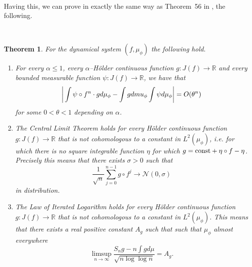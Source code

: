 \documentclass[12pt]{amsart}
\numberwithin{equation}{section}
\newcommand{\nl}{\newline}
\newtheorem{thm}{Theorem}[section]
\def\sp{\medskip}             \def\fr{\noindent}        \def\nl{\newline}
\begin{document}
\

\fr Having this, we can prove in exactly the same way as Theorem~56
in \cite{SUZ1}, the following. 

\

\begin{thm}\label{t220110627}
For the dynamical system $(f,\mu_\phi)$ the following hold.
\begin{enumerate}
\item{} For every $\alpha\le 1$, every $\alpha$--H\"older continuous
  function $g:J(f)\to \mathbb{R}$ and every bounded measurable
  function $\psi:J(f)\to\mathbb{R}$, we have that
$$
\bigg|\int\psi\circ f^n \cdot g d\mu_\phi
-\int g d\\mu_\phi\int\psi d\mu_\phi\bigg|
=O(\theta^n)
$$
for some $0<\theta<1$ depending on $\alpha$.

\sp\item{} The Central Limit Theorem holds for every H\"older continuous
  function $g:J(f)\to  \mathbb{R}$ that is not
  cohomologous to a constant in $L^2(\mu_\phi)$, i.e. for which there is no
  square integrable function $\eta$ for which $g={\rm
    const}+\eta\circ f-\eta$. Precisely this means that
 there exists $\sigma>0$ such that
$$
\frac{1}{\sqrt{n}}{\sum_{j=0}^{n-1}g\circ f^j} \to \mathcal N(0,\sigma)
$$ 
in distribution.
\sp\item{} The Law of Iterated Logarithm holds for every H\"older continuous
function $g:J(f)\to \mathbb{R}$ that is not cohomologous to a constant
in $L^2(\mu_\phi)$. This means that there exists a real positive
constant $A_g$ such that such that $\mu_\phi$ almost everywhere 
$$
\limsup_{n\to\infty}\frac{S_{n}g-n\int gd\mu}{\sqrt{n\log\log n}}=A_g. 
$$
\end{enumerate}
\end{thm}
\end{document}
